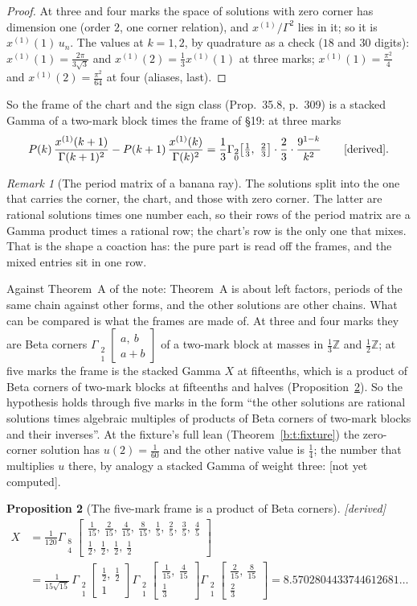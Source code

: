 \documentclass[11pt]{article}
\newcommand{\Gst}[4]{\Gamma_{\substack{#1\\#2}}\!\begin{bmatrix}#3\\#4\end{bmatrix}}
\theoremstyle{plain}
\newtheorem{proposition}{Proposition}[section]
\theoremstyle{definition}
\theoremstyle{remark}
\newtheorem{remark}[proposition]{Remark}
\newcommand{\derived}{\textup{[derived]}}
\newcommand{\notyet}{\textup{[not yet computed]}}
\begin{document}
\begin{proof}
At three and four marks the space of solutions with zero corner has dimension one (order $2$, one corner relation), and $x^{(1)}/\Gamma^2$ lies in it; so it is $x^{(1)}(1)\,u_n$. The values at $k=1,2$, by quadrature as a check ($18$ and $30$ digits): $x^{(1)}(1)=\frac{2\pi}{3\sqrt3}$ and $x^{(1)}(2)=\frac13x^{(1)}(1)$ at three marks; $x^{(1)}(1)=\frac{\pi^2}4$ and $x^{(1)}(2)=\frac{\pi^2}{64}$ at four (aliases, last).
\end{proof}

\noindent So the frame of the chart and the sign class (Prop.~35.8, p.~309) is a stacked Gamma of a two-mark block times the frame of \S19: at three marks
\[
P(k)\,\frac{x^{(1)}(k+1)}{\Gamma(k+1)^2}-P(k+1)\,\frac{x^{(1)}(k)}{\Gamma(k)^2}=\frac13\Gst20{\frac13,\ \frac23}{}\cdot\frac23\cdot\frac{9^{1-k}}{k^2}\qquad\derived .
\]

\begin{remark}[The period matrix of a banana ray]\label{b:r:periodmatrix}
The solutions split into the one that carries the corner, the chart, and those with zero corner. The latter are rational solutions times one number each, so their rows of the period matrix are a Gamma product times a rational row; the chart's row is the only one that mixes. That is the shape a coaction has: the pure part is read off the frames, and the mixed entries sit in one row.

Against Theorem~A of the note: Theorem~A is about left factors, periods of the same chain against other forms, and the other solutions are other chains. What can be compared is what the frames are made of. At three and four marks they are Beta corners $\Gst21{a,\ b}{a+b}$ of a two-mark block at masses in $\frac13\mathbb Z$ and $\frac12\mathbb Z$; at five marks the frame is the stacked Gamma $X$ at fifteenths, which is a product of Beta corners of two-mark blocks at fifteenths and halves (Proposition~\ref{c:p:frame}). So the hypothesis holds through five marks in the form ``the other solutions are rational solutions times algebraic multiples of products of Beta corners of two-mark blocks and their inverses''. At the fixture's full lean (Theorem~\ref{b:t:fixture}) the zero-corner solution has $u(2)=\frac1{60}$ and the other native value is $\frac14$; the number that multiplies $u$ there, by analogy a stacked Gamma of weight three: \notyet.
\end{remark}

\begin{proposition}[The five-mark frame is a product of Beta corners]\label{c:p:frame}\derived\
\begin{align*}
X&=\frac1{120}\Gst84{\frac1{15},\ \frac2{15},\ \frac4{15},\ \frac8{15},\ \frac15,\ \frac25,\ \frac35,\ \frac45}{\frac12,\ \frac12,\ \frac12,\ \frac12}\\
&=\frac1{15\sqrt{15}}\,\Gst21{\frac12,\ \frac12}{1}\Gst21{\frac1{15},\ \frac4{15}}{\frac13}\Gst21{\frac2{15},\ \frac8{15}}{\frac23}=8.5702804433744612681\ldots
\end{align*}
\end{proposition}
\end{document}
